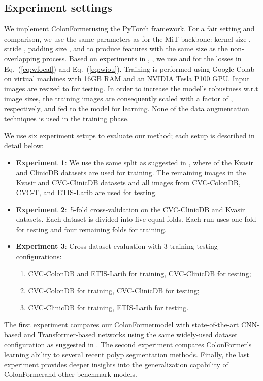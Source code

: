 \documentclass{article}
\newcommand{\ModelName}{ColonFormer}
\begin{document}
{\subsection{Experiment settings}
We implement \ModelName using the PyTorch framework. For a fair setting and comparison, we use the same parameters as \cite{segformer} for the MiT backbone: kernel size , stride , padding size , and  to produce features with the same size as the non-overlapping process. Based on experiments in \cite{f3net}, \cite{focalloss}, we use  and  for the losses in Eq.~(\ref{eq:wfocal}) and Eq.~(\ref{eq:wiou}). Training is performed using Google Colab on virtual machines with 16GB RAM and an NVIDIA Tesla P100 GPU. Input images are resized to  for testing. In order to increase the model's robustness w.r.t image sizes, the training images are consequently scaled with a factor of , respectively,  and fed to the model for learning. None of the data augmentation techniques is used in the training phase. 

We use six experiment setups to evaluate our method; each setup is described in detail below: 
\begin{itemize}
\item \textbf{Experiment 1}: We use the same split as suggested in \cite{pranet}, where  of the Kvasir and ClinicDB datasets are used for training. The remaining images in the Kvasir and CVC-ClinicDB datasets and all images from CVC-ColonDB, CVC-T, and ETIS-Larib are used for testing. 
\item \textbf{Experiment 2}:~5-fold cross-validation on the CVC-ClinicDB and Kvasir datasets. Each dataset is divided into five equal folds. Each run uses one fold for testing and four remaining folds for training.
\item \textbf{Experiment 3}: Cross-dataset evaluation with 3 training-testing configurations:
\begin{enumerate}
\item CVC-ColonDB and ETIS-Larib for training, CVC-ClinicDB for testing;
\item CVC-ColonDB for training, CVC-ClinicDB for testing;
\item CVC-ClinicDB for training, ETIS-Larib for testing.
\end{enumerate}
\end{itemize}

The first experiment compares our \ModelName model with state-of-the-art CNN-based and Transformer-based networks using the same widely-used dataset configuration as suggested in \cite{pranet}.
The second experiment compares \ModelName's learning ability to several recent polyp segmentation methods. Finally, the last experiment provides deeper insights into the generalization capability of \ModelName and other benchmark models. 

}
\end{document}

